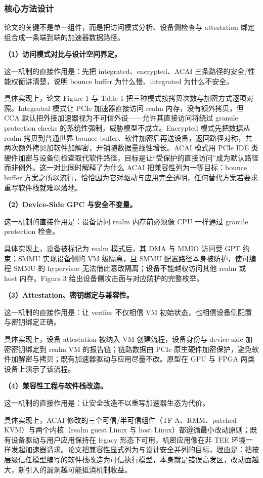 \documentclass[11pt]{ctexart}
\begin{document}
\subsubsection{核心方法设计}
论文的关键不是单一组件，而是把访问模式分析、设备侧检查与 attestation 绑定组合成一条端到端的加速器数据路径。\par
\noindent\textbf{（1）访问模式对比与设计空间界定。}\par
这一机制的直接作用是：先把 integrated、encrypted、ACAI 三条路径的安全/性能权衡讲清楚，说明 bounce buffer 为什么慢、integrated 为什么不安全。\par
具体实现上，论文 Figure 1 与 Table 1 把三种模式按拷贝次数与加密方式逐项对照。Integrated 模式让 PCIe 加速器直接访问 realm 内存，没有额外拷贝，但 CCA 默认把外接加速器视为不可信外设——允许其直接访问将绕过 granule protection checks 的系统性强制，威胁模型不成立。Encrypted 模式先把数据从 realm 拷贝到普通世界 bounce buffer、软件加密后再送设备，返回路径对称，共两次额外拷贝加软件加解密，开销随数据量线性增长。ACAI 模式用 PCIe IDE 类硬件加密与设备侧检查取代软件路径，目标是让“受保护的直接访问”成为默认路径而非例外。这一对比同时解释了为什么 ACAI 把兼容性列为一等目标：bounce buffer 方案之所以流行，恰恰因为它对驱动与应用完全透明，任何替代方案若要求重写软件栈就难以落地。\par
\noindent\textbf{（2）Device-Side GPC 与安全不变量。}\par
这一机制的直接作用是：设备访问 realm 内存前必须像 CPU 一样通过 granule protection 检查。\par
具体实现上，设备被标记为 realm 模式后，其 DMA 与 MMIO 访问受 GPT 约束；SMMU 实现设备侧的 VM 级隔离，且 SMMU 配置路径本身被防护，使可编程 SMMU 的 hypervisor 无法借此篡改隔离；设备不能越权访问其他 realm 或 host 内存。Figure 3 给出设备侧攻击面与对应防护的完整枚举。\par
\noindent\textbf{（3）Attestation、密钥绑定与兼容性。}\par
这一机制的直接作用是：让 verifier 不仅相信 VM 初始状态，也相信设备侧配置与密钥绑定正确。\par
具体实现上，设备 attestation 被纳入 VM 创建流程，设备身份与 device-side 加密密钥绑定到 realm VM 的报告链；链路数据由 PCIe 原生硬件加密保护，避免软件加解密与拷贝；既有加速器驱动与应用尽量不改。原型在 GPU 与 FPGA 两类设备上演示了该流程。\par
\noindent\textbf{（4）兼容性工程与软件栈改造。}\par
这一机制的直接作用是：让安全改造不以重写加速器生态为代价。\par
具体实现上，ACAI 修改的三个可信/半可信组件（TF-A、RMM、patched KVM）与两个内核（realm guest Linux 与 host Linux）都遵循最小改动原则；既有设备驱动与用户应用保持在 legacy 形态下可用，机密应用像在非 TEE 环境一样发起加速器请求。论文把兼容性显式列为与设计安全并列的目标，理由是：把按层级信任模型编写的软件栈改造为可信执行模型，本身就是错误高发区，改动面越大，新引入的漏洞越可能抵消机制收益。\par
\end{document}

